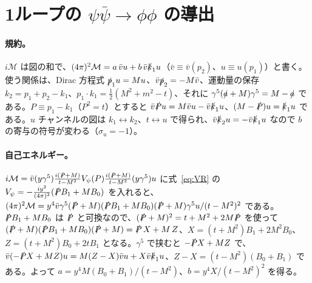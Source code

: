 \documentclass[a4paper,10pt]{ltjsarticle}
\begin{document}
\section{1ループの $\psi\bar\psi\to\phi\phi$ の導出}\label{app:scatB}

\paragraph{規約。}$i\mathcal M$ は図の和で、$(4\pi)^2\mathcal M=a\,\bar vu+b\,\bar v\slashed k_1u$（$\bar v\equiv\bar v(p_2)$、$u\equiv u(p_1)$）と書く。使う関係は、Dirac 方程式 $\slashed p_1u=Mu$、$\bar v\slashed p_2=-M\bar v$、運動量の保存 $k_2=p_1+p_2-k_1$、$p_1\cdot k_1=\frac12(M^2+m^2-t)$、それに $\gamma^5(\slashed a+M)\gamma^5=M-\slashed a$ である。$P\equiv p_1-k_1$（$P^2=t$）とすると $\bar v\slashed Pu=M\bar vu-\bar v\slashed k_1u$、$(M-\slashed P)u=\slashed k_1u$ である。$u$ チャンネルの図は $k_1\leftrightarrow k_2$、$t\leftrightarrow u$ で得られ、$\bar v\slashed k_2u=-\bar v\slashed k_1u$ なので $b$ の寄与の符号が変わる（$\sigma_u=-1$）。

\paragraph{自己エネルギー。}$i\mathcal M=\bar v(y\gamma^5)\frac{i(\slashed P+M)}{t-M^2}V_\psi(P)\frac{i(\slashed P+M)}{t-M^2}(y\gamma^5)u$ に式~\eqref{eq:VR} の $V_\psi=-\frac{iy^2}{(4\pi)^2}(\slashed PB_1+MB_0)$ を入れると、$(4\pi)^2\mathcal M=y^4\bar v\gamma^5(\slashed P+M)(\slashed PB_1+MB_0)(\slashed P+M)\gamma^5u/(t-M^2)^2$ である。$\slashed PB_1+MB_0$ は $\slashed P$ と可換なので、$(\slashed P+M)^2=t+M^2+2M\slashed P$ を使って $(\slashed P+M)(\slashed PB_1+MB_0)(\slashed P+M)=\slashed P\,X+M\,Z$、$X=(t+M^2)B_1+2M^2B_0$、$Z=(t+M^2)B_0+2tB_1$ となる。$\gamma^5$ で挟むと $-\slashed PX+MZ$ で、$\bar v(-\slashed PX+MZ)u=M(Z-X)\bar vu+X\bar v\slashed k_1u$、$Z-X=(t-M^2)(B_0+B_1)$ である。よって $a=y^4M(B_0+B_1)/(t-M^2)$、$b=y^4X/(t-M^2)^2$ を得る。
\end{document}

